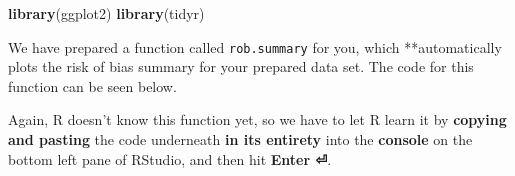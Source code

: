\documentclass[]{book}
\newenvironment{Shaded}{\begin{snugshade}}{\end{snugshade}}
\newcommand{\KeywordTok}[1]{\textcolor[rgb]{0.13,0.29,0.53}{\textbf{#1}}}
\newcommand{\NormalTok}[1]{#1}
\theoremstyle{definition}
\theoremstyle{definition}
\theoremstyle{definition}
\theoremstyle{remark}
\begin{document}
\begin{Shaded}
\begin{Highlighting}[]
\KeywordTok{library}\NormalTok{(ggplot2)}
\KeywordTok{library}\NormalTok{(tidyr)}
\end{Highlighting}
\end{Shaded}

We have prepared a function called \texttt{rob.summary} for you, which
**automatically plots the risk of bias summary for your prepared data
set. The code for this function can be seen below.

Again, R doesn't know this function yet, so we have to let R learn it by
\textbf{copying and pasting} the code underneath \textbf{in its
entirety} into the \textbf{console} on the bottom left pane of RStudio,
and then hit \textbf{Enter ⏎}.
\end{document}
